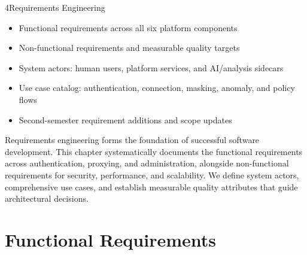 
\begin{sectionintro}{4}{Requirements Engineering}{
  \begin{itemize}[leftmargin=1.5em]
    \item Functional requirements across all six platform components
    \item Non-functional requirements and measurable quality targets
    \item System actors: human users, platform services, and AI/analysis sidecars
    \item Use case catalog: authentication, connection, masking, anomaly, and policy flows
    \item Second-semester requirement additions and scope updates
  \end{itemize}
}
Requirements engineering forms the foundation of successful software development. This chapter systematically documents the functional requirements across authentication, proxying, and administration, alongside non-functional requirements for security, performance, and scalability. We define system actors, comprehensive use cases, and establish measurable quality attributes that guide architectural decisions.
\end{sectionintro}

\section{Functional Requirements}

